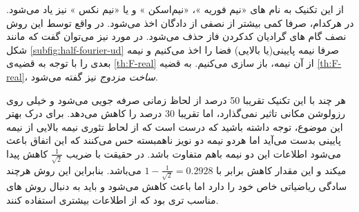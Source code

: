 از این تکنیک به نام های «نیم فوریه »، «نیم‌اسکن » و یا «نیم نکس » نیز یاد می‌شود. در هرکدام، صرفا کمی بیشتر از نصفی از دادگان اخذ می‌شود.  در واقع توسط این روش نصف گام های گرادیان کد‌کردن فاز حذف می‌شود. در مورد \kspace نیز می‌توان گفت که مانند شکل \ref{subfig:half-fourier-ud} صرفا نیمه پایینی(یا بالایی) فضا را اخذ می‌کنیم و نیمه بعدی را با توجه به قضیه‌‌ی \ref{th:F-real} از آن نیمه، باز سازی می‌کنیم. به قضیه‌ \ref{th:F-real}، \textit{ساخت مزدوج}
نیز گفته می‌شود. 

هر چند با این تکنیک تقریبا 50 درصد از لحاظ زمانی صرفه جویی می‌شود و خیلی روی رزولوشن مکانی تاثیر نمی‌گذارد، اما تقریبا 30 درصد  را کاهش می‌دهد.\cite{McRobbie} برای درک بهتر این موضوع، توجه داشته باشید که درست است که از لحاط تئوری نیمه بالایی \kspace از نیمه پایینی بدست می‌آید اما هردو نیمه دو نویز ناهمبسته حس می‌کنند که این اتفاق باعث می‌شود اطلاعات این دو نیمه باهم متفاوت باشد. در حقیقت  با ضریب
 $\frac{1}{\sqrt{2}}$
کاهش پیدا میکند و این مقدار کاهش برابر با
 $1-\frac{1}{\sqrt{2}}= 0.2928$
می‌باشد. بنابراین این روش هرچند سادگی ریاضیاتی خاص خود را دارد اما باعث کاهش  می‌شود و باید به دنبال روش های مناسب تری بود که از اطلاعات بیشتری استفاده کنند.




